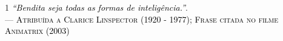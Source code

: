 \documentclass[12pt]{article} %
\begin{document}
	
	\thispagestyle{empty}
	\ifhyperref{}\fi
	\begin{flushright}
		\begin{spacing}{1}
			\mbox{}\vfill
			\vspace*{1.0cm}
			{\sffamily\itshape
				\textcolor{black}{``Bendita seja todas as formas de inteligência.''}}. \\
			--- \textcolor{black}{\textsc{Atribuída a Clarice Linspector (1920 - 1977); Frase citada no filme Animatrix (2003)}} \\
			\vspace*{1.0cm}
		\end{spacing}
	\end{flushright}
\end{document}
